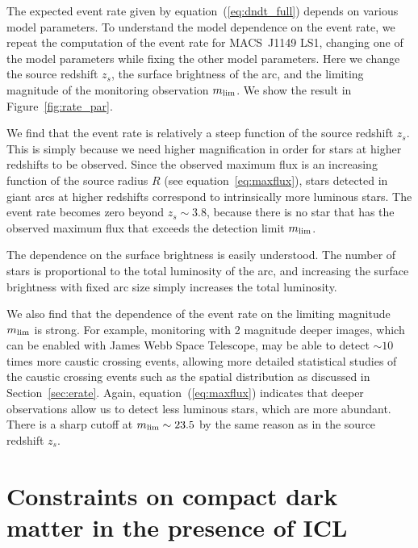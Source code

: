 \documentclass[showpacs,twocolumn,preprintnumbers,amsmath,amssymb,superscriptaddress,nofootinbib]{revtex4}
\begin{document}
The expected event rate given by equation~(\ref{eq:dndt_full}) depends
on various model parameters. To understand the model dependence on the
event rate, we repeat the computation of the event rate for MACS~J1149
LS1, changing one of the model parameters while fixing the other model
parameters. Here we change the source redshift $z_s$, the surface
brightness of the arc, and the limiting magnitude of the monitoring
observation $m_{\rm lim}$. We show the result in
Figure~\ref{fig:rate_par}. 

We find that the event rate is relatively a steep function of the source
redshift $z_s$. This is simply because we need higher magnification
in order for stars at higher redshifts to be observed. Since the
observed maximum flux is an increasing function of the source radius
$R$ (see equation~\ref{eq:maxflux}), stars detected in giant arcs at
higher redshifts correspond to intrinsically more luminous stars. The
event rate becomes zero beyond $z_s\sim 3.8$, because there is no star
that has the observed maximum flux that exceeds the detection limit
$m_{\rm lim}$.

The dependence on the surface brightness is easily understood. The
number of stars is proportional to the total luminosity of the arc,
and increasing the surface brightness with fixed arc size simply
increases the total luminosity.

We also find that the dependence of the event rate on the limiting
magnitude $m_{\rm lim}$ is strong. For example, monitoring with 2
magnitude deeper images, which can be enabled with James Webb Space
Telescope,  may be able to detect $\sim 10$ times more caustic
crossing events, allowing more detailed statistical studies of the
caustic crossing events such as the spatial distribution as discussed
in Section~\ref{sec:erate}. Again, equation~(\ref{eq:maxflux})
indicates that deeper observations allow us to detect less luminous
stars, which are more abundant. There is a sharp cutoff at
$m_{\rm  lim}\sim 23.5$ by the same reason as in the source redshift $z_s$.

\section{Constraints on compact dark matter in the presence of ICL}
\label{sec:compactdm}
\end{document}
